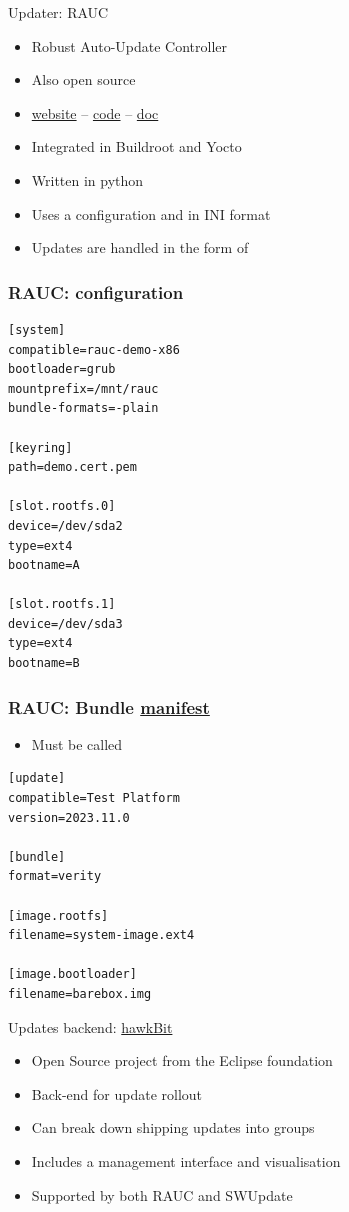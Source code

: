 \begin{frame}{Updater: RAUC}
  \begin{itemize}
    \item Robust Auto-Update Controller
    \item Also open source
    \item \href{https://rauc.io/}{website} -- \href{https://github.com/rauc/rauc}{code} -- \href{https://rauc.readthedocs.io/en/latest/}{doc}
    \item Integrated in Buildroot and Yocto
    \item Written in python
    \item Uses a configuration and  in INI format
    \item Updates are handled in the form of 
  \end{itemize}
\end{frame}

\begin{frame}[fragile]
  \frametitle{RAUC: configuration}
  \begin{verbatim}
[system]
compatible=rauc-demo-x86
bootloader=grub
mountprefix=/mnt/rauc
bundle-formats=-plain

[keyring]
path=demo.cert.pem

[slot.rootfs.0]
device=/dev/sda2
type=ext4
bootname=A

[slot.rootfs.1]
device=/dev/sda3
type=ext4
bootname=B
  \end{verbatim}
\end{frame}

\begin{frame}[fragile]
  \frametitle{RAUC: Bundle \href{https://rauc.readthedocs.io/en/latest/reference.html\#sec-ref-manifest}{manifest}}
  \begin{itemize}
    \item Must be called 
  \end{itemize}
  \begin{verbatim}
[update]
compatible=Test Platform
version=2023.11.0

[bundle]
format=verity

[image.rootfs]
filename=system-image.ext4

[image.bootloader]
filename=barebox.img
  \end{verbatim}
\end{frame}

\begin{frame}{Updates backend: \href{https://hawkbit.eclipse.dev}{hawkBit}}
  \begin{itemize}
    \item Open Source project from the Eclipse foundation
    \item Back-end for update rollout
    \item Can break down shipping updates into groups
    \item Includes a management interface and visualisation
    \item Supported by both RAUC and SWUpdate
  \end{itemize}
\end{frame}

